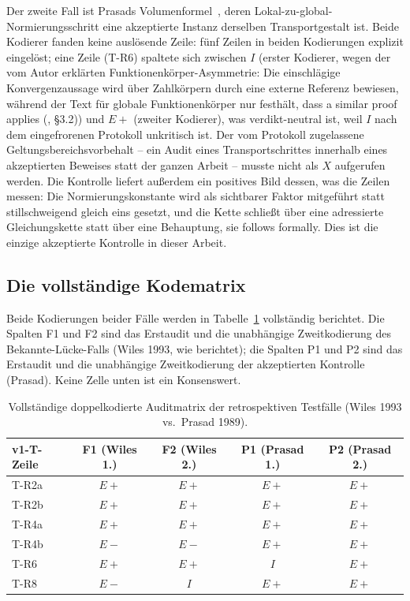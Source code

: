 \documentclass[11pt,a4paper]{article}
\begin{document}
Der zweite Fall ist Prasads Volumenformel~\cite{prasad}, deren
Lokal-zu-global-Normierungsschritt eine akzeptierte Instanz derselben
Transportgestalt ist. Beide Kodierer fanden keine auslösende Zeile: fünf
Zeilen in beiden Kodierungen explizit eingelöst; eine Zeile (T-R6) spaltete
sich zwischen $I$ (erster Kodierer, wegen der vom Autor erklärten
Funktionenkörper-Asymmetrie: Die einschlägige Konvergenzaussage wird über
Zahlkörpern durch eine externe Referenz bewiesen, während der Text für globale
Funktionenkörper nur festhält, dass \glqq a similar proof applies\grqq{}
(\cite{prasad}, \S3.2)) und $E{+}$
(zweiter Kodierer), was verdikt-neutral ist, weil $I$ nach dem eingefrorenen
Protokoll unkritisch ist. Der vom Protokoll zugelassene
Geltungsbereichsvorbehalt -- ein Audit eines Transportschrittes innerhalb
eines akzeptierten Beweises statt der ganzen Arbeit -- musste nicht als $X$
aufgerufen werden. Die Kontrolle liefert außerdem ein positives Bild dessen,
was die Zeilen messen: Die Normierungskonstante wird als sichtbarer Faktor
mitgeführt statt stillschweigend gleich eins gesetzt, und die Kette schließt
über eine adressierte Gleichungskette statt über eine Behauptung, sie
\glqq follows formally\grqq{}.
Dies ist die einzige akzeptierte Kontrolle in dieser Arbeit.

\subsection{Die vollständige Kodematrix}\label{sec:matrix}

Beide Kodierungen beider Fälle werden in Tabelle~\ref{tab:code_matrix_retrospective} vollständig berichtet. Die Spalten F1
und F2 sind das Erstaudit und die unabhängige Zweitkodierung des
Bekannte-Lücke-Falls (Wiles 1993, wie berichtet); die Spalten P1 und P2 sind
das Erstaudit und die unabhängige Zweitkodierung der akzeptierten Kontrolle
(Prasad). Keine Zelle unten ist ein Konsenswert.

\begin{table}[htbp]
\centering
\setlength{\tabcolsep}{4.5pt}
\caption{Vollständige doppelkodierte Auditmatrix der retrospektiven Testfälle (Wiles 1993 vs.\ Prasad 1989).}
\label{tab:code_matrix_retrospective}
\begin{tabular}{@{}lcccc@{}}
\toprule
v1-T-Zeile & F1 (Wiles 1.) & F2 (Wiles 2.) & P1 (Prasad 1.) & P2 (Prasad 2.) \\
\midrule
T-R2a & $E{+}$ & $E{+}$ & $E{+}$ & $E{+}$ \\
\addlinespace[3pt]
T-R2b & $E{+}$ & $E{+}$ & $E{+}$ & $E{+}$ \\
\addlinespace[3pt]
T-R4a & $E{+}$ & $E{+}$ & $E{+}$ & $E{+}$ \\
\addlinespace[3pt]
T-R4b & $E{-}$ & $E{-}$ & $E{+}$ & $E{+}$ \\
\addlinespace[3pt]
T-R6 & $E{+}$ & $E{+}$ & $I$ & $E{+}$ \\
\addlinespace[3pt]
T-R8 & $E{-}$ & $I$ & $E{+}$ & $E{+}$ \\
\bottomrule
\end{tabular}
\end{table}
\end{document}
